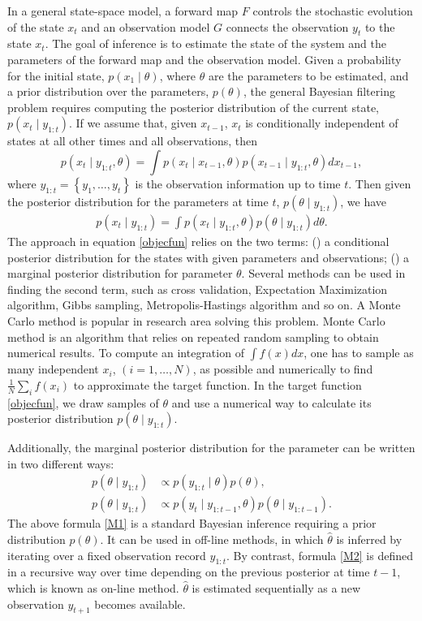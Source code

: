 In a general state-space model, a forward map $F$ controls the stochastic evolution of the state $x_t$ and an observation model $G$ connects the observation $y_t$ to the state $x_t$. The goal of inference is to estimate the state of the system and the parameters of the forward map and the observation model. Given a probability for the initial state, $p(x_1\mid \theta)$, where $\theta$ are the parameters to be estimated, and a prior distribution over the parameters, $p(\theta)$, the general Bayesian filtering problem requires computing the posterior distribution of the current state, $p(x_t \mid y_{1:t})$. If we assume that, given $x_{t-1}$, $x_t$ is conditionally independent of states at all other times and all observations, then
\begin{equation*}
p(x_t\mid y_{1:t},\theta) = \int p(x_t\mid x_{t-1},\theta)p(x_{t-1}\mid y_{1:t},\theta) dx_{t-1}, 
\end{equation*}
where $y_{1:t} = \left\lbrace y_1,\dots,y_t\right\rbrace$ is the observation information up to time $t$. Then given the posterior distribution for the parameters at time $t$, $p(\theta\mid y_{1:t})$, we have 
\begin{align}\label{objecfun}
p(x_t \mid y_{1:t}) = \int p(x_t \mid y_{1:t},\theta)p(\theta\mid y_{1:t})d\theta.
\end{align}
The approach in equation \eqref{objecfun} relies on the two terms: () a conditional posterior distribution for the states with given parameters and observations; () a marginal posterior distribution for parameter $\theta$. Several methods can be used in finding the second term, such as cross validation, Expectation Maximization algorithm, Gibbs sampling, Metropolis-Hastings algorithm and so on. A Monte Carlo method is popular in research area solving this problem. Monte Carlo method is an algorithm that relies on repeated random sampling to obtain numerical results. To compute an integration of $\int f(x)dx$, one has to sample as many independent $x_i$, $(i = 1,\dots, N)$, as possible and numerically to find $\frac{1}{N}\sum_i f(x_i)$ to approximate the target function. In the target function \eqref{objecfun}, we draw samples of $\theta$ and use a numerical way to calculate its posterior distribution $p(\theta\mid y_{1:t})$. 


Additionally, the marginal posterior distribution for the parameter can be written in two different ways: 
\begin{align}\label{M1}
p(\theta \mid y_{1:t}) &\propto p(y_{1:t}\mid\theta)p(\theta),\\
p(\theta \mid y_{1:t}) &\propto p(y_t\mid y_{1:t-1}, \theta)p(\theta\mid y_{1:t-1}). \label{M2}
\end{align}
The above formula \eqref{M1} is a standard Bayesian inference requiring a prior distribution $p(\theta)$. It can be used in off-line methods, in which $\hat{\theta}$ is inferred by iterating over a fixed observation record $y_{1:t}$. By contrast, formula \eqref{M2} is defined in a recursive way over time depending on the previous posterior at time $t-1$, which is known as on-line method. $\hat{\theta}$ is estimated sequentially as a new observation $y_{t+1}$ becomes available. 


